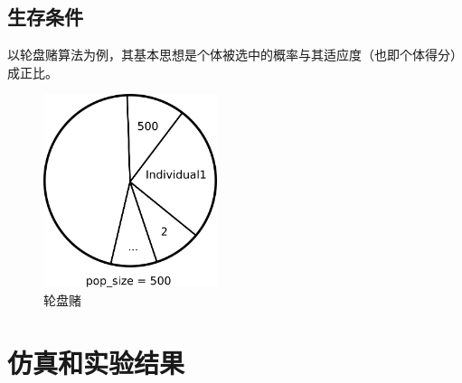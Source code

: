 \documentclass[14pt, a4paper]{article}
\begin{document}
    \subsection{生存条件}
        以轮盘赌算法为例，其基本思想是个体被选中的概率与其适应度（也即个体得分）成正比。 
        \begin{figure}[htbp]
            \centering
            \includegraphics[width= 2in]{fig/轮盘算法.png}
            \caption{轮盘赌}
            \label{fig4}
        \end{figure}       
\section{仿真和实验结果}
\end{document}
